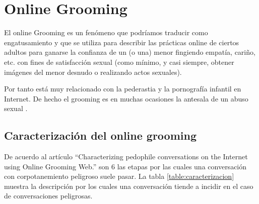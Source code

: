 \section{Online Grooming}
El online Grooming es un fenómeno que podr\'iamos traducir como engatusamiento y que se utiliza para describir las pr\'acticas online de ciertos adultos para ganarse la confianza de un (o una) menor fingiendo empat\'ia, cariño, etc. con fines de satisfacción sexual (como m\'inimo, y casi siempre, obtener im\'agenes del menor desnudo o realizando actos sexuales).

Por tanto est\'a muy relacionado con la pederastia y la pornograf\'ia infantil en Internet. De hecho el grooming es en muchas ocasiones la antesala de un abuso sexual \cite{grooming}.

\subsection{Caracterización del online grooming}
De acuerdo al art\'iculo ``Characterizing pedophile conversations on the Internet using Online Grooming Web.'' \cite{articulo} son 6 las etapas por las cuales una conversaci\'on con corpotanemiento peligroso suele pasar. 
La tabla \ref{table:caracterizacion} muestra la descripci\'on por los cuales una conversaci\'on tiende a incidir en el caso de conversaciones peligrosas.

